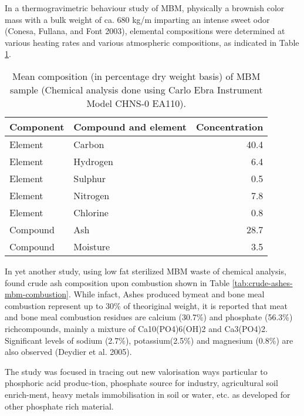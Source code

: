 \documentclass[
]{article}
\begin{document}
In a thermogravimetric behaviour study of MBM, physically a brownish color mass with a bulk weight of ca. 680 kg/m imparting an intense sweet odor (Conesa, Fullana, and Font 2003), elemental compositions were determined at various heating rates and various atmospheric compositions, as indicated in Table \ref{tab:component-composition-drywt-mbm-thermogravimetric}.

\begin{longtable}[t]{llr}
\caption{\label{tab:component-composition-drywt-mbm-thermogravimetric}Mean composition (in percentage dry weight basis) of MBM sample (Chemical analysis done using Carlo Ebra Instrument Model CHNS-0 EA110).}\\
\toprule
Component & Compound and element & Concentration\\
\midrule
Element & Carbon & 40.4\\
Element & Hydrogen & 6.4\\
Element & Sulphur & 0.5\\
Element & Nitrogen & 7.8\\
Element & Chlorine & 0.8\\
\addlinespace
Compound & Ash & 28.7\\
Compound & Moisture & 3.5\\
\bottomrule
\end{longtable}

In yet another study, using low fat sterilized MBM waste of chemical analysis, found crude ash composition upon combustion shown in Table \ref{tab:crude-ashes-mbm-combustion}. While infact, Ashes produced bymeat and bone meal combustion represent up to 30\% of theoriginal weight, it is reported that meat and bone meal combustion residues are calcium (30.7\%) and phosphate (56.3\%) richcompounds, mainly a mixture of Ca10(PO4)6(OH)2 and Ca3(PO4)2. Significant levels of sodium (2.7\%), potassium(2.5\%) and magnesium (0.8\%) are also observed (Deydier et al. 2005).

The study was focused in tracing out new valorisation ways particular to phosphoric acid produc-tion, phosphate source for industry, agricultural soil enrich-ment, heavy metals immobilisation in soil or water, etc. as developed for other phosphate rich material.
\end{document}
